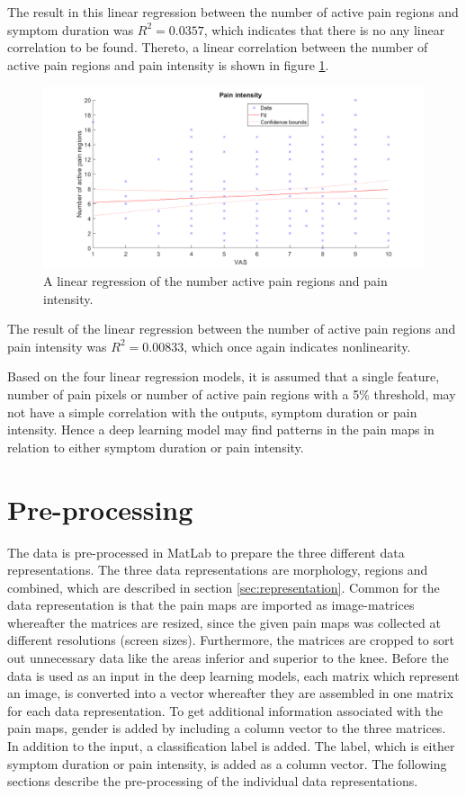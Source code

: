 \noindent
The result in this linear regression between the number of active pain regions and symptom duration was $R^2=0.0357$, which indicates that there is no any linear correlation to be found.\newline
Thereto, a linear correlation between the number of active pain regions and pain intensity is shown in figure \ref{fig:regPain}.

\begin{figure} [H]
\centering
\includegraphics[width=1\textwidth]{figures/regionsRegressionPain}
\caption{A linear regression of the number active pain regions and pain intensity.}
\label{fig:regPain}
\end{figure}

\noindent
The result of the linear regression between the number of active pain regions and pain intensity was $R^2=0.00833$, which once again indicates nonlinearity. 

\noindent
Based on the four linear regression models, it is assumed that a single feature, number of pain pixels or number of active pain regions with a 5\% threshold, may not have a simple correlation with the outputs, symptom duration or pain intensity. Hence a deep learning model may find patterns in the pain maps in relation to either symptom duration or pain intensity.



\section{Pre-processing} \label{sec:prepros}
The data is pre-processed in MatLab to prepare the three different data representations. The three data representations are morphology, regions and combined, which are described in section \ref{sec:representation}. Common for the data representation is that the pain maps are imported as image-matrices whereafter the matrices are resized, since the given pain maps was collected at different resolutions (screen sizes). Furthermore, the matrices are cropped to sort out unnecessary data like the areas inferior and superior to the knee.
Before the data is used as an input in the deep learning models, each matrix which represent an image, is converted into a vector whereafter they are assembled in one matrix for each data representation. To get additional information associated with the pain maps, gender is added by including a column vector to the three matrices.
In addition to the input, a classification label is added. The label, which is either symptom duration or pain intensity, is added as a column vector.
The following sections describe the pre-processing of the individual data representations.

